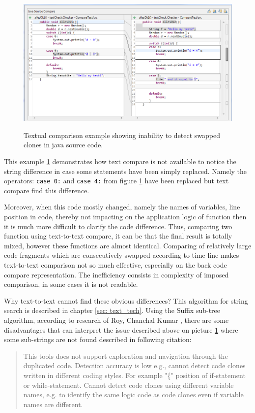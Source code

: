 \documentclass{report}
\begin{document}
\begin{figure}[h]
  \centering
  \includegraphics[scale = 0.5]{Figures/text-to-text/text-compare-shifted.png}\\[0.1cm]
  \caption[Textual comparison example showing inability to detect swapped clones]{Textual comparison example showing inability to detect swapped clones in java source code.}
  \label{fig:text-to-text-compare-shifted}
\end{figure}

This example \ref{fig:text-to-text-compare-shifted} demonstrates how text compare is not available to notice the string difference in case some statements have been simply replaced. Namely the operators: \texttt{case 0:} and \texttt{case 4:} from figure \ref{fig:text-to-text-compare-shifted} have been replaced but text compare find this difference. 

Moreover, when this code mostly changed, namely the names of variables, line position in code, thereby not impacting on the application logic of function then it is much more difficult to clarify the code difference. Thus, comparing two function using text-to-text compare, it can be that the final result is totally mixed, however these functions are almost identical. Comparing of relatively large code fragments which are consecutively swapped according to time line makes text-to-text comparison not so much effective, especially on the back code compare representation. The inefficiency consists in complexity of imposed comparison, in some cases it is not readable. 

Why text-to-text cannot find these obvious differences? This algorithm for string search is described in chapter \ref{sec: text_tech}. Using the Suffix sub-tree algorithm,  according to research of Roy, Chanchal Kumar \cite{software_clone_detection}, there are some disadvantages that can interpret the issue described above on picture \ref{fig:text-to-text-compare-shifted} where some sub-strings are not found described in following citation:
\begin{quote} 
This tools does not support exploration and navigation through the duplicated code. Detection accuracy is low e.g., cannot detect code clones written in different coding styles. For example "\{" position of if-statement or while-statement. Cannot detect code clones using different variable names, e.g. to identify the same logic code as code clones even if variable names are different\cite{software_clone_detection}. 
\end{quote}
\end{document}
